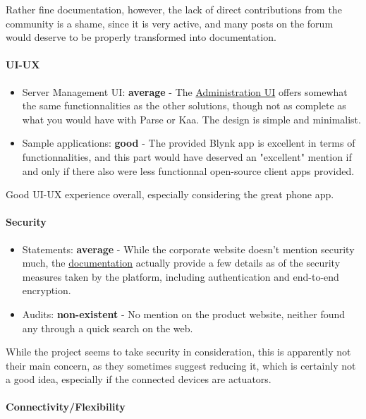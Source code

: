 \documentclass{article}
\begin{document}
Rather fine documentation, however, the lack of direct contributions from the community is a shame, since it is very active, and many posts on the forum would deserve to be properly transformed into documentation.

\paragraph{UI-UX}

\begin{itemize}
\item Server Management UI: \textbf{average} - The \href{https://github.com/blynkkk/blynk-server#administration-ui}{Administration UI} offers somewhat the same functionnalities as the other solutions, though not as complete as what you would have with Parse or Kaa. The design is simple and minimalist.
\item Sample applications: \textbf{good} - The provided Blynk app is excellent in terms of functionnalities, and this part would have deserved an "excellent" mention if and only if there also were less functionnal open-source client apps provided.
\end{itemize}

Good UI-UX experience overall, especially considering the great phone app.

\paragraph{Security}

\begin{itemize}
\item Statements: \textbf{average} - While the corporate website doesn't mention security much, the \href{http://docs.blynk.cc/#security}{documentation} actually provide a few details as of the security measures taken by the platform, including authentication and end-to-end encryption.
\item Audits: \textbf{non-existent} - No mention on the product website, neither found any through a quick search on the web.
\end{itemize}

While the project seems to take security in consideration, this is apparently not their main concern, as they sometimes suggest reducing it, which is certainly not a good idea, especially if the connected devices are actuators.

\paragraph{Connectivity/Flexibility}
\end{document}
